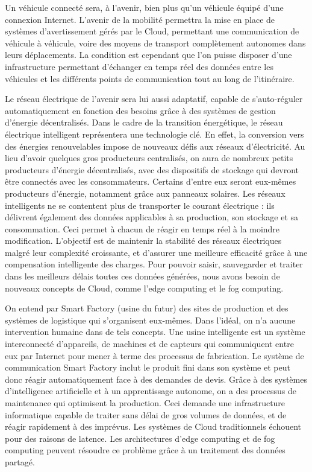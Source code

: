 Un véhicule connecté sera, à l’avenir, bien plus qu’un véhicule équipé d’une connexion Internet. L’avenir de la mobilité permettra la mise en place de systèmes d’avertissement gérés par le Cloud, permettant une communication de véhicule à véhicule, voire des moyens de transport complètement autonomes dans leurs déplacements. La condition est cependant que l’on puisse disposer d’une infrastructure permettant d’échanger en temps réel des données entre les véhicules et les différents points de communication tout au long de l’itinéraire.


Le réseau électrique de l’avenir sera lui aussi adaptatif, capable de s’auto-réguler automatiquement en fonction des besoins grâce à des systèmes de gestion d’énergie décentralisés. Dans le cadre de la transition énergétique, le réseau électrique intelligent représentera une technologie clé. En effet, la conversion vers des énergies renouvelables impose de nouveaux défis aux réseaux d’électricité. Au lieu d’avoir quelques gros producteurs centralisés, on aura de nombreux petits producteurs d’énergie décentralisés, avec des dispositifs de stockage qui devront être connectés avec les consommateurs. Certains d’entre eux seront eux-mêmes producteurs d’énergie, notamment grâce aux panneaux solaires. Les réseaux intelligents ne se contentent plus de transporter le courant électrique : ils délivrent également des données applicables à sa production, son stockage et sa consommation. Ceci permet à chacun de réagir en temps réel à la moindre modification. L’objectif est de maintenir la stabilité des réseaux électriques malgré leur complexité croissante, et d’assurer une meilleure efficacité grâce à une compensation intelligente des charges. Pour pouvoir saisir, sauvegarder et traiter dans les meilleurs délais toutes ces données générées, nous avons besoin de nouveaux concepts de Cloud, comme l’edge computing et le fog computing.


On entend par Smart Factory (usine du futur) des sites de production et des systèmes de logistique qui s'organisent eux-mêmes. Dans l’idéal, on n’a aucune intervention humaine dans de tels concepts. Une usine intelligente est un système interconnecté d’appareils, de machines et de capteurs qui communiquent entre eux par Internet pour mener à terme des processus de fabrication. Le système de communication Smart Factory inclut le produit fini dans son système et peut donc réagir automatiquement face à des demandes de devis. Grâce à des systèmes d’intelligence artificielle et à un apprentissage autonome, on a des processus de maintenance qui optimisent la production. Ceci demande une infrastructure informatique capable de traiter sans délai de gros volumes de données, et de réagir rapidement à des imprévus. Les systèmes de Cloud traditionnels échouent pour des raisons de latence. Les architectures d’edge computing et de fog computing peuvent résoudre ce problème grâce à un traitement des données partagé.


